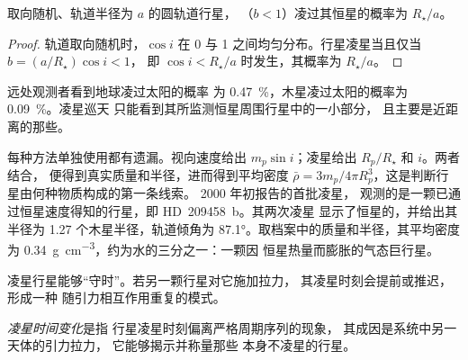 \begin{omfigure}
\par{}\label{fig:b3:exoplanets:transit}
\end{omfigure}

\begin{proposition}[凌星概率]\label{prop:b3:exoplanets:probability}
取向随机、轨道半径为 $a$ 的圆轨道行星，
（$b < 1$）凌过其恒星的概率为 $R_\star/a$。
\end{proposition}

\begin{proof}
轨道取向随机时，$\cos i$ 在
0 与 1 之间均匀分布。行星凌星当且仅当 $b = (a/R_\star)\cos i < 1$，
即 $\cos i < R_\star/a$ 时发生，其概率为 $R_\star/a$。
\end{proof}

远处观测者看到地球凌过太阳的概率
为 \qty{0.47}{\percent}，木星凌过太阳的概率为 \qty{0.09}{\percent}。凌星巡天
只能看到其所监测恒星周围行星中的一小部分，
且主要是近距离的那些。

每种方法单独使用都有遗漏。视向速度给出
$m_p\sin i$；凌星给出 $R_p/R_\star$ 和 $i$。两者结合，
便得到真实质量和半径，进而得到平均密度
$\bar\rho = 3m_p/4\pi R_p^3$，这是判断行星由何种物质构成的第一条线索。
2000 年初报告的首批凌星，
观测的是一颗已通过恒星速度得知的行星，即 HD~209458~b。其两次凌星
显示了恒星的，并给出其半径为 1.27 个木星半径，轨道倾角为
\ang{87.1}。取档案中的质量和半径，其平均密度为
\qty{0.34}{g.cm^{-3}}，约为水的三分之一：一颗因
恒星热量而膨胀的气态巨行星。

凌星行星能够“守时”。若另一颗行星对它施加拉力，
其凌星时刻会提前或推迟，形成一种
随引力相互作用重复的模式。

\begin{definition}[凌星时间变化]\label{def:b3:exoplanets:ttv}
\emph{凌星时间变化}是指
行星凌星时刻偏离严格周期序列的现象，
其成因是系统中另一天体的引力拉力，
它能够揭示并称量那些
本身不凌星的行星。
\end{definition}

